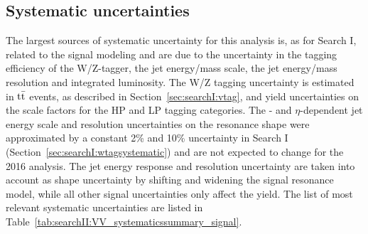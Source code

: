 \subsection{Systematic uncertainties}
The largest sources of systematic uncertainty for this analysis is, as for Search I, related to the signal modeling and are due to the uncertainty in the tagging efficiency of the W/Z-tagger, the jet energy/mass scale, the jet energy/mass resolution and integrated luminosity. The W/Z tagging uncertainty is estimated in $\rm{t\bar{t}}$ events, as described in Section~\ref{sec:searchI:vtag}, and yield uncertainties on the scale factors for the HP and LP tagging categories.
The \pt- and $\eta$-dependent jet energy scale and resolution uncertainties on the resonance shape were approximated by a constant 2\% and 10\% uncertainty in Search I (Section~\ref{sec:searchI:wtagsystematic}) and are not expected to change for the 2016 analysis. The jet energy response and resolution uncertainty are taken into account as shape uncertainty by shifting and widening the signal resonance model,
while all other signal uncertainties only affect the yield. The list of most relevant systematic uncertainties are listed in Table~\ref{tab:searchII:VV_systematicssummary_signal}.
